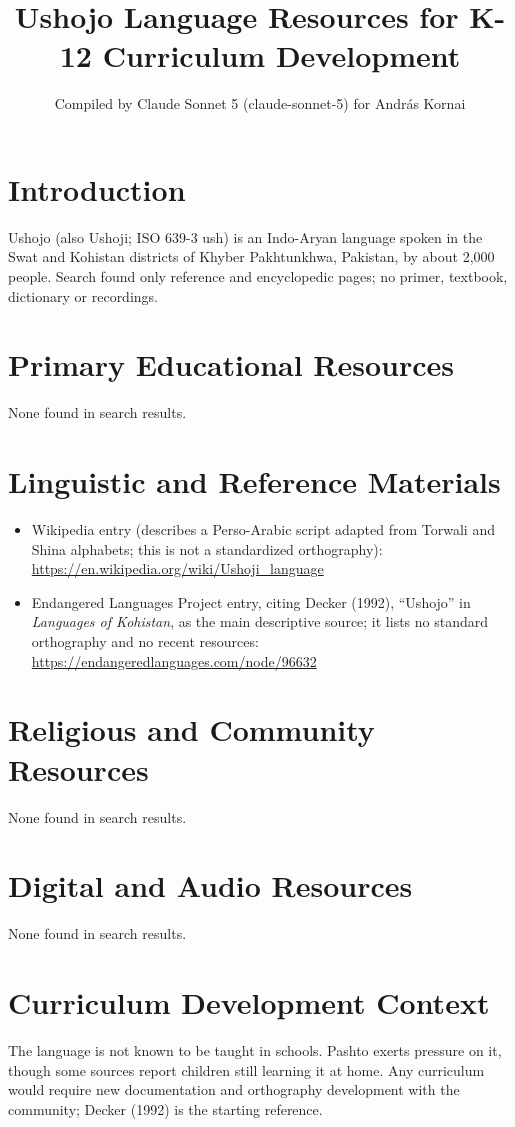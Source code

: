 \documentclass[12pt]{article}
\title{Ushojo Language Resources for K-12 Curriculum Development}
\author{Compiled by Claude Sonnet 5 (claude-sonnet-5) for Andr\'as Kornai}
\date{}
\begin{document}
\maketitle
\section{Introduction}
Ushojo (also Ushoji; ISO 639-3 ush) is an Indo-Aryan language spoken in the Swat and Kohistan districts of Khyber Pakhtunkhwa, Pakistan, by about 2,000 people. Search found only reference and encyclopedic pages; no primer, textbook, dictionary or recordings.
\section{Primary Educational Resources}
None found in search results.
\section{Linguistic and Reference Materials}
\begin{itemize}
\item Wikipedia entry (describes a Perso-Arabic script adapted from Torwali and Shina alphabets; this is not a standardized orthography): \url{https://en.wikipedia.org/wiki/Ushoji_language}
\item Endangered Languages Project entry, citing Decker (1992), ``Ushojo'' in \emph{Languages of Kohistan}, as the main descriptive source; it lists no standard orthography and no recent resources: \url{https://endangeredlanguages.com/node/96632}
\end{itemize}
\section{Religious and Community Resources}
None found in search results.
\section{Digital and Audio Resources}
None found in search results.
\section{Curriculum Development Context}
The language is not known to be taught in schools. Pashto exerts pressure on it, though some sources report children still learning it at home. Any curriculum would require new documentation and orthography development with the community; Decker (1992) is the starting reference.
\end{document}
